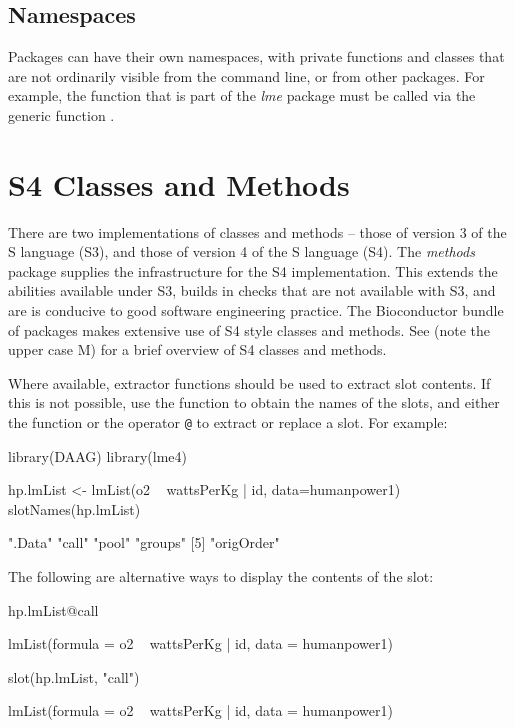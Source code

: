 \subsection*{Namespaces}
Packages can have their own namespaces, with private functions and
classes that are not ordinarily visible from the command line, or from
other packages.  For example, the function 
that is part of the \textit{lme} package must be called via the generic
function .

\section{S4 Classes and Methods}\label{sec:s4}
There are two implementations of classes and methods -- those of
version 3 of the S language (S3), and those of version 4 of the S
language (S4).  The \textit{methods} package supplies the
infrastructure for the S4 implementation. This extends the abilities
available under S3, builds in checks that are not available with S3,
and are is conducive to good software engineering practice.  The
Bioconductor bundle of packages makes extensive use of S4 style
classes and methods. See  (note the upper case M)
for a brief overview of S4 classes and methods.

Where available, extractor functions should be used to extract slot
contents. If this is not possible, use the function
 to obtain the names of the slots, and either the
function  or the operator \verb!@! to extract or
replace a slot.  For example:
\begin{Schunk}
\begin{Sinput}
library(DAAG)
library(lme4)
\end{Sinput}
\begin{Sinput}
hp.lmList <- lmList(o2 ~ wattsPerKg | id,
                    data=humanpower1)
slotNames(hp.lmList)
\end{Sinput}
\begin{Soutput}
[1] ".Data"     "call"      "pool"      "groups"   
[5] "origOrder"
\end{Soutput}
\end{Schunk}

The following are alternative ways to display the contents of the
 slot:
\begin{fullwidth}
\begin{Schunk}
\begin{Sinput}
hp.lmList@call
\end{Sinput}
\begin{Soutput}
lmList(formula = o2 ~ wattsPerKg | id, data = humanpower1)
\end{Soutput}
\begin{Sinput}
slot(hp.lmList, "call")
\end{Sinput}
\begin{Soutput}
lmList(formula = o2 ~ wattsPerKg | id, data = humanpower1)
\end{Soutput}
\end{Schunk}
\end{fullwidth}


